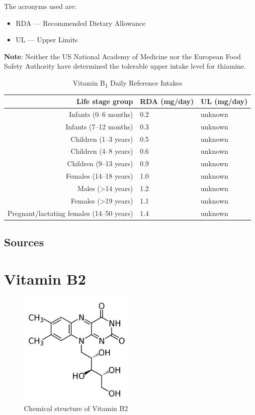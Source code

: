 \documentclass{book}
\begin{document}
The acronyms used are:
\begin{itemize}
	\item RDA --- Recommended Dietary Allowance
	\item UL --- Upper Limits
\end{itemize}

\textbf{Note}: Neither the US National Academy of Medicine nor the European Food Safety Authority have determined the tolerable upper intake level for thiamine.

\begin{table}[h]
	\caption{Vitamin B\textsubscript{1} Daily Reference Intakes}
	\centering \begin{tabular}{| r | l | l |}
		\hline
		\textbf{Life stage group} & \textbf{RDA (mg/day)} & \textbf{UL (mg/day)}\\ \hline
		Infants (0--6 months) & 0.2 & unknown\\ \hline
		Infants (7--12 months) & 0.3 & unknown\\ \hline
		Children (1--3 years) & 0.5 & unknown\\ \hline
		Children (4--8 years) & 0.6 & unknown\\ \hline
		Children (9--13 years) & 0.9 & unknown\\ \hline
		Females (14--18 years) & 1.0 & unknown\\ \hline
		Males (\textgreater14 years) & 1.2 & unknown\\ \hline
		Females (\textgreater19 years) & 1.1 & unknown\\ \hline
		Pregnant/lactating females (14--50 years) & 1.4 & unknown\\ \hline
	\end{tabular}
\end{table}
\newpage

\section{Sources}


\chapter{Vitamin B2}
\begin{figure}[h]
	\caption{Chemical structure of Vitamin B2}
	\centering \includegraphics[width=0.5\textwidth]{images/Vitamin_B2_chemical_structure}
\end{figure}
\end{document}
